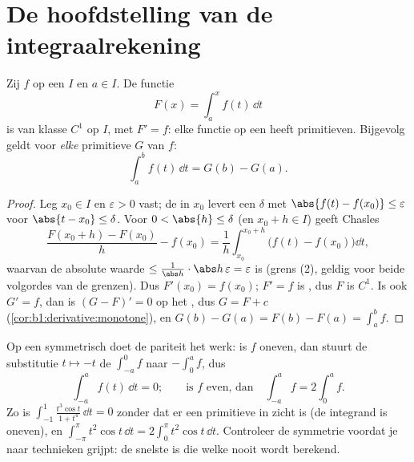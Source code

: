 \section{De hoofdstelling van de integraalrekening}

\begin{theorem}\label{thm:b1:integration:ftc}
Zij $f$  op een  $I$ en $a \in I$. De functie
\[
F(x) = \int_a^x f(t)\, \dd t
\]
is van klasse $C^1$ op $I$, met $F' = f$: elke  functie op
een  heeft primitieven. Bijgevolg geldt voor \emph{elke}
primitieve $G$ van $f$:
\[
\int_a^b f(t)\,\dd t = G(b) - G(a) .
\]
\end{theorem}

\begin{proof}
Leg $x_0 \in I$ en $\varepsilon > 0$ vast; de  in $x_0$
levert een $\delta$ met $\abs{f(t) - f(x_0)} \leq \varepsilon$ voor
$\abs{t - x_0} \leq \delta$. Voor $0 < \abs{h} \leq \delta$ (en $x_0
+ h \in I$) geeft Chasles
\[
\frac{F(x_0 + h) - F(x_0)}{h} - f(x_0)
= \frac 1h \int_{x_0}^{x_0+h} \bigl(f(t) - f(x_0)\bigr)\dd t ,
\]
waarvan de absolute waarde $\leq \frac{1}{\abs h}\cdot \abs h\,
\varepsilon = \varepsilon$ is (grens (2), geldig voor beide
volgordes van de grenzen). Dus $F'(x_0) = f(x_0)$; $F' = f$ is
, dus $F$ is $C^1$. Is ook $G' = f$, dan is $(G - F)' = 0$ op
het , dus $G = F + c$
(\cref{cor:b1:derivative:monotone}), en $G(b) - G(a) = F(b) - F(a) =
\int_a^b f$.
\end{proof}

\begin{example}\label{ex:b1:integration:parity}
Op een symmetrisch  doet de pariteit het werk: is $f$
oneven, dan stuurt de substitutie $t \mapsto -t$ de 
$\int_{-a}^{0} f$ naar $-\int_0^a f$, dus
\[
\int_{-a}^{a} f(t)\,\dd t = 0 ;
\qquad\text{is $f$ even, dan}\quad
\int_{-a}^{a} f = 2\int_0^a f .
\]
Zo is $\int_{-1}^{1} \frac{t^3\cos t}{1 + t^4}\,\dd t = 0$ zonder
dat er een primitieve in zicht is (de integrand is oneven), en
$\int_{-\pi}^{\pi} t^2\cos t\,\dd t = 2\int_0^\pi t^2\cos t\,
\dd t$. Controleer de symmetrie voordat je naar technieken
grijpt: de snelste  is die welke nooit wordt berekend.
\end{example}

